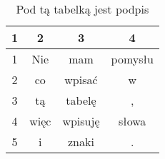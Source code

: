 \begin{table}[htbp]
\centering
\begin{tabular}{||c c c c||} 
 \hline
 1 & 2 & 3 & 4 \\ [0.5ex] 
 \hline\hline
 1 & Nie & mam & pomysłu \\ 
 \hline
 2 & co & wpisać & w  \\
 \hline
 3 & tą & tabelę & , \\
 \hline
 4 & więc & wpisuję & słowa \\
 \hline
 5 & i  & znaki & . \\
 \hline
\end{tabular}
\label{tab:random_numbers2}
\caption{Pod tą tabelką jest podpis}
\end{table}